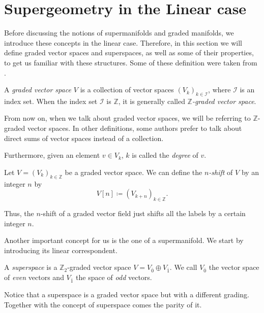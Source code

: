 \section{Supergeometry in the Linear case}
\label{sec:Linear_case}

Before discussing the notions of supermanifolds and graded manifolds, we introduce these concepts in the linear case.
Therefore, in this section we will define graded vector spaces and superspaces, as well as some of their properties, to get us familiar with these structures.
Some of these definition were taken from \cite{Binda}.

\begin{definition}
    A \emph{graded vector space $V$} is a collection of vector spaces $(V_k)_{k \in \mathcal{I}}$, where $\mathcal{I}$ is an index set.
    When the index set $\mathcal{I}$ is $\mathbb{Z}$, it is generally called \emph{$\mathbb{Z}$-graded vector space}.
\end{definition}

From now on, when we talk about graded vector spaces, we will be referring to $\mathbb{Z}$-graded vector spaces.
In other definitions, some authors prefer to talk about direct sums of vector spaces instead of a collection.

Furthermore, given an element $v \in V_k$, $k$ is called the \emph{degree} of $v$.

\begin{definition}
    Let $V = (V_k)_{k \in \mathbb{Z}}$ be a graded vector space.
    We can define the \emph{$n$-shift} of $V$ by an integer $n$ by
    \begin{equation*}
        V[n] \coloneqq (V_{k + n})_{k \in \mathbb{Z}} .
    \end{equation*}
\end{definition}
Thus, the $n$-shift of a graded vector field just shifts all the labels by a certain integer $n$.

Another important concept for us is the one of a supermanifold.
We start by introducing its linear correspondent.

\begin{definition}
    A \emph{superspace} is a $\mathbb{Z}_2$-graded vector space $V = V_{\bar{0}} \oplus V_{\bar{1}}$.
    We call $V_{\bar{0}}$ the vector space of \emph{even} vectors and $V_{\bar{1}}$ the space of \emph{odd} vectors.
\end{definition}

Notice that a superspace is a graded vector space but with a different grading.
Together with the concept of superspace comes the parity of it.

